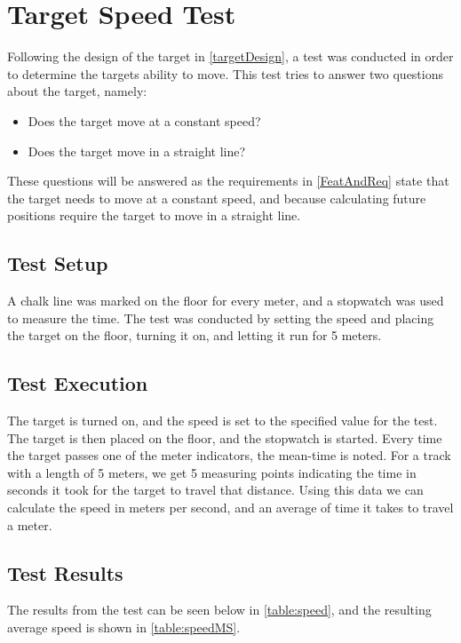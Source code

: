 \chapter{Target Speed Test}\label{speedotesto}
Following the design of the target in \autoref{targetDesign}, a test was
conducted in order to determine the targets ability to move. This test tries to
answer two questions about the target, namely:
\begin{itemize}
  \item Does the target move at a constant speed?
  \item Does the target move in a straight line?
\end{itemize}

These questions will be answered as the requirements in \autoref{FeatAndReq}
state that the target needs to move at a constant speed, and because calculating
future positions require the target to move in a straight line.

\section{Test Setup}
A chalk line was marked on the floor for every meter, and a stopwatch was used
to measure the time. The test was conducted by setting the speed and placing the
target on the floor, turning it on, and letting it run for 5 meters.

\section{Test Execution}
The target is turned on, and the speed is set to the specified value for the
test. The target is then placed on the floor, and the stopwatch is started.
Every time the target passes one of the meter indicators, the mean-time is
noted.
For a track with a length of 5 meters, we get 5 measuring points indicating the
time in seconds it took for the target to travel that distance. Using this data
we can calculate the speed in meters per second, and an average of time it
takes to travel a meter.

\section{Test Results}
The results from the test can be seen below in \autoref{table:speed}, and the
resulting average speed is shown in \autoref{table:speedMS}. 



